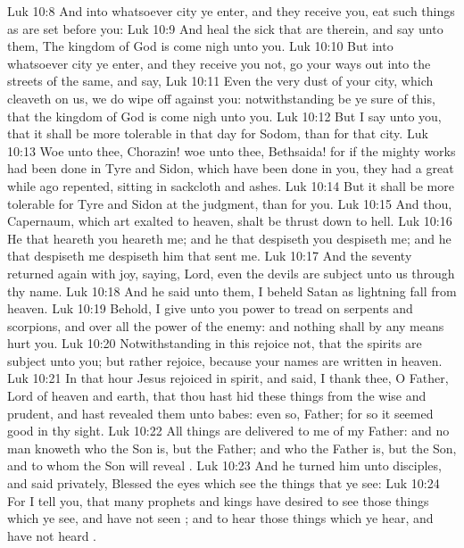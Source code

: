 \vs Luk 10:8 And into whatsoever city ye enter, and they receive you, eat such things as are set before you:
\vs Luk 10:9 And heal the sick that are therein, and say unto them, The kingdom of God is come nigh unto you.
\vs Luk 10:10 But into whatsoever city ye enter, and they receive you not, go your ways out into the streets of the same, and say,
\vs Luk 10:11 Even the very dust of your city, which cleaveth on us, we do wipe off against you: notwithstanding be ye sure of this, that the kingdom of God is come nigh unto you.
\vs Luk 10:12 But I say unto you, that it shall be more tolerable in that day for Sodom, than for that city.
\vs Luk 10:13 Woe unto thee, Chorazin! woe unto thee, Bethsaida! for if the mighty works had been done in Tyre and Sidon, which have been done in you, they had a great while ago repented, sitting in sackcloth and ashes.
\vs Luk 10:14 But it shall be more tolerable for Tyre and Sidon at the judgment, than for you.
\vs Luk 10:15 And thou, Capernaum, which art exalted to heaven, shalt be thrust down to hell.
\vs Luk 10:16 He that heareth you heareth me; and he that despiseth you despiseth me; and he that despiseth me despiseth him that sent me.
\vs Luk 10:17 And the seventy returned again with joy, saying, Lord, even the devils are subject unto us through thy name.
\vs Luk 10:18 And he said unto them, I beheld Satan as lightning fall from heaven.
\vs Luk 10:19 Behold, I give unto you power to tread on serpents and scorpions, and over all the power of the enemy: and nothing shall by any means hurt you.
\vs Luk 10:20 Notwithstanding in this rejoice not, that the spirits are subject unto you; but rather rejoice, because your names are written in heaven.
\vs Luk 10:21 In that hour Jesus rejoiced in spirit, and said, I thank thee, O Father, Lord of heaven and earth, that thou hast hid these things from the wise and prudent, and hast revealed them unto babes: even so, Father; for so it seemed good in thy sight.
\vs Luk 10:22 All things are delivered to me of my Father: and no man knoweth who the Son is, but the Father; and who the Father is, but the Son, and  to whom the Son will reveal .
\vs Luk 10:23 And he turned him unto  disciples, and said privately, Blessed  the eyes which see the things that ye see:
\vs Luk 10:24 For I tell you, that many prophets and kings have desired to see those things which ye see, and have not seen ; and to hear those things which ye hear, and have not heard .
